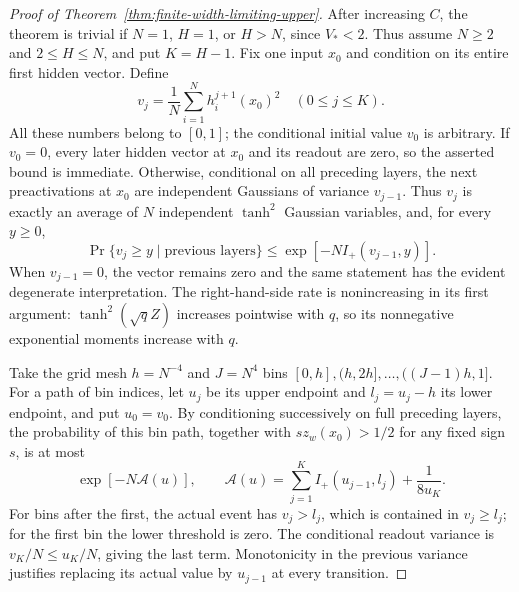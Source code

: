 \begin{proof}[Proof of Theorem~\ref{thm:finite-width-limiting-upper}]
After increasing $C$, the theorem is trivial if $N=1$, $H=1$,
or $H>N$, since $V_*<2$. Thus assume $N\ge2$ and $2\le H\le N$,
and put $K=H-1$.
Fix one input $x_0$ and condition on its entire first hidden vector.
Define
\[
 v_j=\frac1N\sum_{i=1}^N h_i^{j+1}(x_0)^2
       \quad(0\le j\le K).
\]
All these numbers belong to $[0,1]$; the conditional initial value
$v_0$ is arbitrary. If $v_0=0$, every later hidden vector at $x_0$
and its readout are zero, so the asserted bound is immediate.
Otherwise, conditional on all preceding layers, the next
preactivations at $x_0$ are independent Gaussians of variance
$v_{j-1}$. Thus $v_j$ is exactly an average of $N$ independent
$\tanh^2$ Gaussian variables, and, for every $y\ge0$,
\[
 \Pr\{v_j\ge y\mid\text{previous layers}\}
 \le\exp[-N I_+(v_{j-1},y)].
\]
When $v_{j-1}=0$, the vector remains zero and the same statement has
the evident degenerate interpretation.
The right-hand-side rate is nonincreasing in its first argument:
$\tanh^2(\sqrt qZ)$ increases pointwise with $q$, so its nonnegative
exponential moments increase with $q$.

Take the grid mesh $h=N^{-4}$ and $J=N^4$ bins
$[0,h],(h,2h],\ldots,((J-1)h,1]$.
For a path of bin indices, let $u_j$ be its upper endpoint and
$l_j=u_j-h$ its lower endpoint, and put $u_0=v_0$.
By conditioning successively on full preceding layers, the probability
of this bin path, together with $s z_w(x_0)>1/2$ for any fixed sign
$s$, is at most
\[
 \exp[-N\mathcal A(u)],\qquad
 \mathcal A(u)=\sum_{j=1}^K I_+(u_{j-1},l_j)+\frac1{8u_K}.
\]
For bins after the first, the actual event has $v_j>l_j$, which is
contained in $v_j\ge l_j$; for the first bin the lower threshold is zero.
The conditional readout variance is $v_K/N\le u_K/N$, giving the
last term. Monotonicity in the previous variance justifies replacing
its actual value by $u_{j-1}$ at every transition.


\end{proof}
